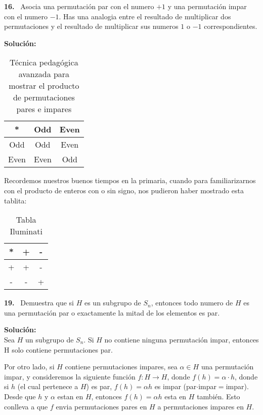 \documentclass{article}
\newcounter{problem}
\newcounter{solution}
\newcommand\Problem[1]{%
  \stepcounter{problem}%
  \textbf{#1.}~%
  \setcounter{solution}{0}%
}
\newcommand\TheSolution{%
  \textbf{Solución:}\\%
}
\begin{document}
\Problem{16} Asocia una permutación par con el numero $+1$ y una permutación
impar con el numero $-1$. Has una analogia entre el resultado de multiplicar
dos permutaciones y el resultado de multiplicar sus numeros $1$ o $-1$
correspondientes.

\TheSolution{}
\begin{table}[htbp]
\begin{center}
\begin{tabular}{c|cc}
* & Odd & Even \\ \hline
Odd & Odd  & Even\\
Even & Even & Odd \\
\end{tabular}
\caption{Técnica pedagógica avanzada para mostrar el producto de permutaciones
pares e impares}
\end{center}
\end{table}

Recordemos nuestros buenos tiempos en la primaria, cuando para familiarizarnos
con el producto de enteros con o sin signo, nos pudieron haber mostrado esta
tablita:

\begin{table}[htbp]
\begin{center}
\begin{tabular}{c|cc}
* & + & - \\ \hline
+ & +  & -\\
- & - & + \\
\end{tabular}
\caption{Tabla Iluminati}
\end{center}
\end{table}

\Problem{19} Demuestra que si $H$ es un subgrupo de $S_n$, entonces todo
numero de $H$ es una permutación par o exactamente la mitad de los elementos
es par.

\TheSolution{}
Sea $H$ un subgrupo de $S_n$. Si $H$ no contiene ninguna permutaci\'on impar,
entonces H solo contiene permutaciones par.

Por otro lado, si $H$ contiene permutaciones impares, sea $\alpha \in H$ una
permutación impar, y consideremos la siguiente función $f: H \rightarrow
H$, donde $f(h) = \alpha \cdot h$, donde si $h$ (el cual pertenece a $H$) es
par, $f(h) = \alpha h$ es impar (par$\cdot$impar$=$impar). Desde que $h$ y
$\alpha$ estan en $H$, entonces $f(h)=\alpha h$ esta en $H$ también. Esto
conlleva a que $f$ envia permutaciones pares en $H$ a permutaciones impares
en $H$.
\end{document}
